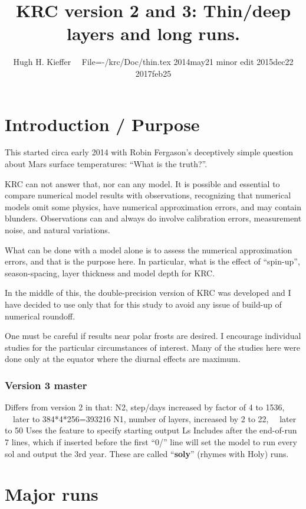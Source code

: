 \documentclass{article}  %
\title{KRC version 2 and 3: Thin/deep layers and long runs.}
\author{Hugh H. Kieffer  \ \ File=-/krc/Doc/thin.tex 2014may21  minor edit 2015dec22 2017feb25}
\begin{document}
\maketitle
\tableofcontents
\listoffigures

\section{Introduction / Purpose}
 This started circa early 2014 with Robin Fergason's deceptively simple question about Mars surface temperatures: ``What is the truth?''. 

 KRC can not answer that, nor can any model.  It is possible and essential to
 compare numerical model results with observations, recognizing that numerical
 models omit some physics, have numerical approximation errors, and may contain
 blunders. Observations can and always do involve calibration errors,
 measurement noise, and natural variations.

What can be done with a model alone is to assess the numerical approximation
errors, and that is the purpose here. In particular, what is the effect of
``spin-up'', season-spacing, layer thickness and model depth for KRC. 

In the middle of this, the double-precision version of KRC was developed and I
have decided to use only that for this study to avoid any issue of build-up of
numerical roundoff.


One must be careful if results near polar frosts are desired. I encourage
individual studies for the particular circumstances of interest.  Many of the
studies here were done only at the equator where the diurnal effects are
maximum.


\subsubsection{Version 3 master} %
Differs from version 2 in that:
\qi N2, step/days increased by factor of 4 to 1536, \ \ later to 384*4*256=393216
\qi N1, number of layers, increased by 2 to 22, \ \ later to 50
\qi Uses the feature to specify starting output Ls
\qi Includes after the end-of-run  7 lines, which if inserted before the first ``0/'' line will set the model to run every sol and output the 3rd year. These are called ``\textbf{soly}'' (rhymes with Holy) runs.

\section{Major runs} %
\end{document}
